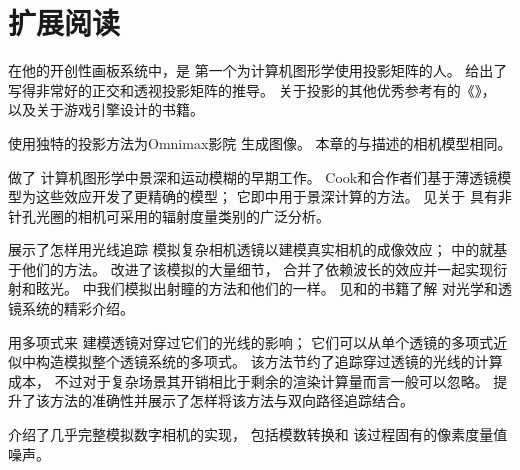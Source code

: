 \section{扩展阅读}\label{sec:扩展阅读06}

在他的开创性画板系统中，\citet{10.1145/1461551.1461591}是
第一个为计算机图形学使用投影矩阵的人。
\citet{10.1201/9781315365459}给出了
写得非常好的正交和透视投影矩阵的推导。
关于投影的其他优秀参考有\citet{10.5555/63448}的《》，
以及\citet{EBERLY2007}关于游戏引擎设计的书籍。

\citet{4056910}使用独特的投影方法为Omnimax\textsuperscript{\textregistered}影院
生成图像。
本章的与\citet{KENTON1992288}描述的相机模型相同。

\citet{10.1145/800224.806818,10.1145/357299.357300,10.1145/800059.801169}做了
计算机图形学中景深和运动模糊的早期工作。
Cook和合作者们基于薄透镜模型为这些效应开发了更精确的模型；
它即中用于景深计算的方法\citep{10.1145/800031.808590,10.1145/7529.8927}。
见\citet{10.2312:EGWR:EGSR07:121-126}关于
具有非针孔光圈的相机可采用的辐射度量类别的广泛分析。

\citet{10.1145/218380.218463}展示了怎样用光线追踪
模拟复杂相机透镜以建模真实相机的成像效应；
中的就基于他们的方法。
\citet{10.1111/j.1467-8659.2011.01851.x}改进了该模拟的大量细节，
合并了依赖波长的效应并一起实现衍射和眩光。
中我们模拟出射瞳的方法和他们的一样。
见\citet{0321188780}和\citet{9780071476874}的书籍了解
对光学和透镜系统的精彩介绍。

\citet{10.1111/j.1467-8659.2012.03132.x}用多项式来
建模透镜对穿过它们的光线的影响；
它们可以从单个透镜的多项式近似中构造模拟整个透镜系统的多项式。
该方法节约了追踪穿过透镜的光线的计算成本，
不过对于复杂场景其开销相比于剩余的渲染计算量而言一般可以忽略。
\citet{10.1111/cgf.12301}提升了该方法的准确性并展示了怎样将该方法与双向路径追踪结合。

\citet{5280315}介绍了几乎完整模拟数字相机的实现，
包括模数转换和
该过程固有的像素度量值噪声。